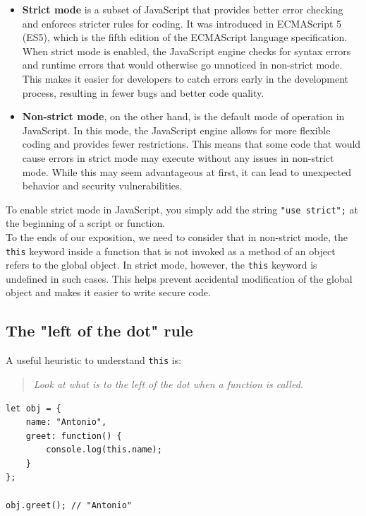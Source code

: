 \documentclass{scrbook}
\begin{document}
\begin{itemize}
    \item
    \textbf{Strict mode} is a subset of JavaScript that provides better error checking and enforces stricter rules for coding. It was introduced in ECMAScript 5 (ES5), which is the fifth edition of the ECMAScript language specification. When strict mode is enabled, the JavaScript engine checks for syntax errors and runtime errors that would otherwise go unnoticed in non-strict mode. This makes it easier for developers to catch errors early in the development process, resulting in fewer bugs and better code quality.

    \item 
    \textbf{Non-strict mode}, on the other hand, is the default mode of operation in JavaScript. In this mode, the JavaScript engine allows for more flexible coding and provides fewer restrictions. This means that some code that would cause errors in strict mode may execute without any issues in non-strict mode. While this may seem advantageous at first, it can lead to unexpected behavior and security vulnerabilities.
\end{itemize}

To enable strict mode in JavaScript, you simply add the string \texttt{"use strict";} at the beginning of a script or function.\\

To the ends of our exposition, we need to consider that in non-strict mode, the \texttt{this} keyword inside a function that is not invoked as a method of an object refers to the global object. In strict mode, however, the \texttt{this} keyword is undefined in such cases. This helps prevent accidental modification of the global object and makes it easier to write secure code.

\subsection{The "left of the dot" rule}

A useful heuristic to understand \texttt{this} is:

\begin{quote}
\textit{Look at what is to the left of the dot when a function is called.}
\end{quote}

\begin{lstlisting}
let obj = {
    name: "Antonio",
    greet: function() {
        console.log(this.name);
    }
};

obj.greet(); // "Antonio"
\end{lstlisting}
\end{document}
